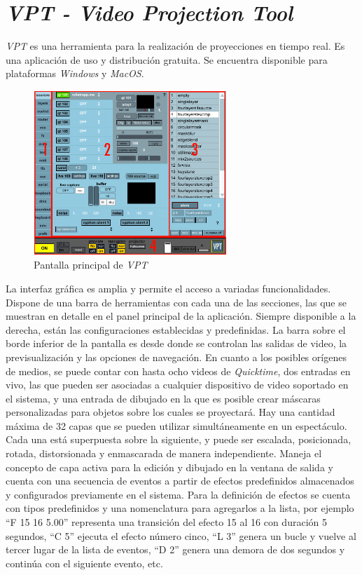 \section{\emph{VPT - Video Projection Tool}}
\emph{VPT}\cite{VPT} es una herramienta para la realización de proyecciones en tiempo real. Es una aplicación de uso y distribución gratuita. Se encuentra disponible para plataformas \emph{Windows} y \emph{MacOS}.

\begin{figure}[H]
  \centering
    \includegraphics[width=0.65\textwidth]{./Cap3_aplicaciones/apps-vpt.png}
  \caption{Pantalla principal de \emph{VPT}}
  \label{fig:Apps-VPT}
\end{figure}

La interfaz gráfica es amplia y permite el acceso a variadas funcionalidades. Dispone de una barra de herramientas con cada una de las secciones, las que se muestran en detalle en el panel principal de la aplicación. Siempre disponible a la derecha, están las configuraciones establecidas y predefinidas. La barra sobre el borde inferior de la pantalla es desde donde se controlan las salidas de video, la previsualización y las opciones de navegación.
En cuanto a los posibles orígenes de medios, se puede contar con hasta ocho videos de \emph{Quicktime}, dos entradas en vivo, las que pueden ser asociadas a cualquier dispositivo de video soportado en el sistema, y una entrada de dibujado en la que es posible crear máscaras personalizadas para objetos sobre los cuales se proyectará.
Hay una cantidad máxima de 32 capas que se pueden utilizar simultáneamente en un espectáculo. Cada una está superpuesta sobre la siguiente, y puede ser escalada, posicionada, rotada, distorsionada y enmascarada de manera independiente. Maneja el concepto de capa activa para la edición y dibujado en la ventana de salida y cuenta con una secuencia de eventos a partir de efectos predefinidos almacenados y configurados previamente en el sistema. Para la definición de efectos se cuenta con tipos predefinidos y una nomenclatura para agregarlos a la lista, por ejemplo ``F 15 16 5.00'' representa una transición del efecto 15 al 16 con duración 5 segundos, ``C 5'' ejecuta el efecto número cinco, ``L 3'' genera un bucle y vuelve al tercer lugar de la lista de eventos, ``D 2'' genera una demora de dos segundos y continúa con el siguiente evento, etc.

